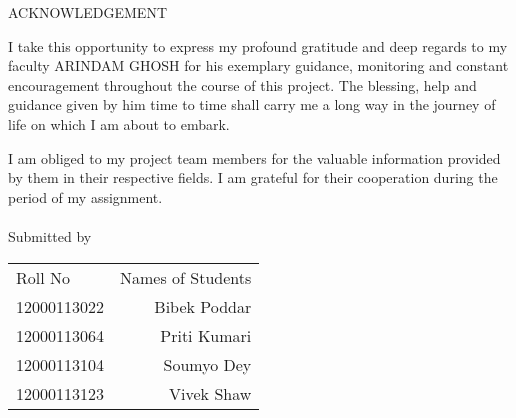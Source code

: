 \newpage
\begin{center}
\huge{\LARGE ACKNOWLEDGEMENT}\\[1cm]
\end{center}







I take this opportunity to express my profound gratitude and deep regards to my faculty  ARINDAM GHOSH for his exemplary guidance, monitoring and constant encouragement throughout the course of this project. The blessing, help and guidance given by him time to time shall carry me a long way in the journey of life on which I am about to embark. 

I am obliged to my project team members for the valuable information provided by them in their respective fields. I am grateful for their cooperation during the period of my assignment. \\
\\

\normalsize 
Submitted by \\
\begin{table}[h]
\begin{tabular}{lr}\\
Roll No & Names of Students 
\\
12000113022 & Bibek Poddar \\
12000113064 & Priti Kumari  \\
12000113104 & Soumyo Dey \\ 
12000113123 & Vivek Shaw \\ 
\end{tabular}
\end{table}

